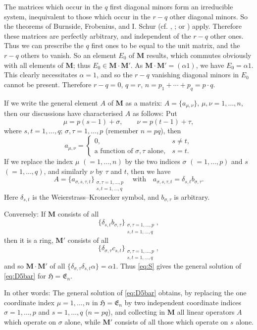 \documentclass[12pt,b5paper,twoside]{article}
\newcommand{\Hspace}{\mathfrak H}
\newcommand{\M}{\mathbf M}
\begin{document}
The matrices which occur in the $q$ first diagonal minors form an irreducible
system, inequivalent to those which occur in the $r-q$ other diagonal minors.
So the theorems of Burnside, Frobenius, and I. Schur
(cf. \cite{ref3}, \cite{ref8}; or \cite[p.~412]{ref14}) apply. Therefore these matrices
are perfectly arbitrary, and independent of the $r-q$ other ones. Thus we can
prescribe the $q$ first ones to be equal to the unit matrix, and the $r-q$ others
to vanish. So an element $E_0$ of $\M$ results, which commutes obviously with
all elements of $\M$; thus $E_0\in\M\cdot\M'$. As
$\M\cdot\M'=(\alpha1)$, we have $E_0=\alpha1$. This clearly necessitates
$\alpha=1$, and so the $r-q$ vanishing diagonal minors in $E_0$ cannot be
present. Therefore $r-q=0$, $q=r$, $n=p_1+\cdots+p_q=p\cdot q$.

If we write the general element $A$ of $\M$ as a matrix:
$A=\{a_{\mu,\nu}\}$, $\mu,\nu=1,\ldots,n$, then our discussions have
characterised $A$ as follows: Put
\[
 \mu=p(s-1)+\sigma,\qquad \nu=p(t-1)+\tau,
\]
where $s,t=1,\ldots,q$; $\sigma,\tau=1,\ldots,p$ (remember $n=pq$), then
\[
 a_{\mu,\nu}=
 \begin{cases}
  0,&s\ne t,\\
  \text{a function of $\sigma,\tau$ alone},&s=t.
 \end{cases}
\]
If we replace the index $\mu$ $(=1,\ldots,n)$ by the two indices $\sigma$
$(=1,\ldots,p)$ and $s$ $(=1,\ldots,q)$, and similarly $\nu$ by $\tau$ and
$t$, then we have
\[
 A=\{a_{\sigma,s,\tau,t}\}_{\substack{\sigma,\tau=1,\ldots,p\\
                                      s,t=1,\ldots,q}}
 \quad\text{with}\quad
 a_{\sigma,s,\tau,t}=\delta_{s,t}b_{\sigma,\tau}.
 \tag{S}\label{eq:S}
\]
Here $\delta_{s,t}$ is the Weierstrass--Kronecker symbol, and
$b_{\sigma,\tau}$ is arbitrary.

Conversely: If $\M$ consists of all
\[
 \{\delta_{s,t}b_{\sigma,\tau}\}_{\substack{\sigma,\tau=1,\ldots,p\\
                                             s,t=1,\ldots,q}},
\]
then it is a ring, $\M'$ consists of all
\[
 \{\delta_{\sigma,\tau}c_{s,t}\}_{\substack{\sigma,\tau=1,\ldots,p\\
                                             s,t=1,\ldots,q}},
\]
and so $\M\cdot\M'$ of all
$\{\delta_{\sigma,\tau}\delta_{s,t}\alpha\}=\alpha1$. Thus \eqref{eq:S}
gives the general solution of \eqref{eq:D5bar} for $\Hspace=\mathfrak E_n$.

In other words: The general solution of \eqref{eq:D5bar} obtains, by replacing
the one coordinate index $\mu=1,\ldots,n$ in $\Hspace=\mathfrak E_n$ by two
independent coordinate indices $\sigma=1,\ldots,p$ and $s=1,\ldots,q$
($n=pq$), and collecting in $\M$ all linear operators $A$ which operate on
$\sigma$ alone, while $\M'$ consists of all those which operate on $s$ alone.
\end{document}
